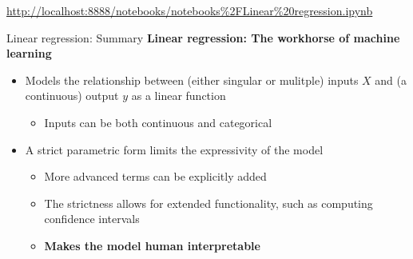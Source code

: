 \begin{frame}
    \centering
    \url{http://localhost:8888/notebooks/notebooks\%2FLinear\%20regression.ipynb}
\end{frame}

\begin{frame}{Linear regression: Summary}
    \textbf{Linear regression: The workhorse of machine learning}
    \begin{itemize}
        \item Models the relationship between (either singular or mulitple) inputs $X$ and (a continuous) output $y$ as a linear function
        \begin{itemize}
            \item Inputs can be both continuous and categorical
        \end{itemize}
        \item A strict parametric form limits the expressivity of the model
        \begin{itemize}
            \item More advanced terms can be explicitly added
            \item The strictness allows for extended functionality, such as computing confidence intervals
            \item \textbf{Makes the model human interpretable}
        \end{itemize}
    \end{itemize}
\end{frame}


